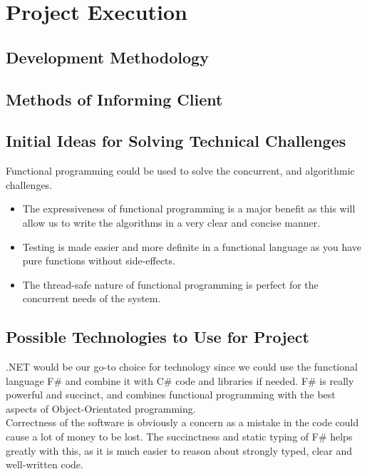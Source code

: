 \documentclass{article}
\begin{document}
\cleardoublepage
    
\section{Project Execution}
	\subsection{Development Methodology}
	
	\subsection{Methods of Informing Client}
	
	\subsection{Initial Ideas for Solving Technical Challenges}
	Functional programming could be used to solve the concurrent, and algorithmic challenges.
	\begin{itemize}
		\item The expressiveness of functional programming is a major benefit as this will allow us to write the algorithms in a very clear and concise manner.
		\item Testing is made easier and more definite in a functional language as you have pure functions without side-effects.
		\item The thread-safe nature of functional programming is perfect for the concurrent needs of the system.
	\end{itemize}

	\subsection{Possible Technologies to Use for Project}
	.NET would be our go-to choice for technology since we could use the functional language F\# and combine it with C\# code and libraries if needed. F\# is really powerful and succinct, and combines functional programming with the best aspects of Object-Orientated programming. \\

	Correctness of the software is obviously a concern as a mistake in the code could cause a lot of money to be lost. The succinctness and static typing of F\# helps greatly with this, as it is much easier to reason about strongly typed, clear and well-written code.\\
\end{document}
